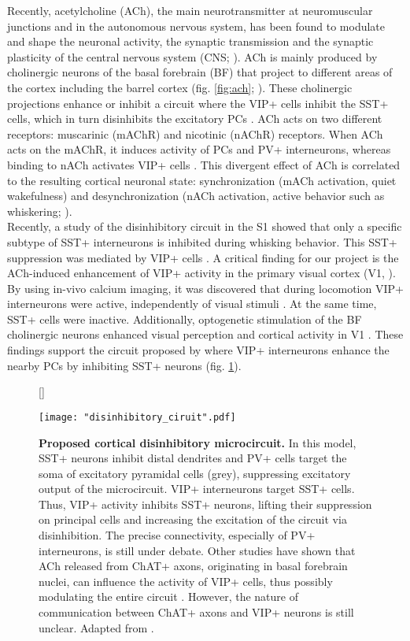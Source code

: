 Recently, acetylcholine (ACh), the main neurotransmitter at neuromuscular junctions and in the autonomous nervous system, has been found to modulate and shape the neuronal activity, the synaptic transmission and the synaptic plasticity of the central nervous system (CNS; \cite{Alitto2013,Fu2014,Picciotto2012a}). ACh is mainly produced by cholinergic neurons of the basal forebrain (BF) that project to different areas of the cortex including the barrel cortex (fig. \ref{fig:ach}; \cite{Thiele2013}). These cholinergic projections enhance or inhibit a circuit where the VIP+ cells inhibit the SST+ cells, which in turn disinhibits the excitatory PCs \citep{Pfeffer2013}. ACh acts on two different receptors: muscarinic (mAChR) and nicotinic (nAChR) receptors. When ACh acts on the mAChR, it induces activity of PCs and PV+ interneurons, whereas binding to nACh activates VIP+ cells \citep{Alitto2013}. This divergent effect of ACh is correlated to the resulting cortical neuronal state: synchronization (mACh activation, quiet wakefulness) and desynchronization (nACh activation, active behavior such as whiskering; \cite{Crochet2006,Eggermann2014}). \\ 
Recently, a study of the disinhibitory circuit in the S1 showed that only a specific subtype of SST+ interneurons is inhibited during whisking behavior. This SST+ suppression was mediated by VIP+ cells \citep{Munoz2017}. A critical finding for our project is the ACh-induced enhancement of VIP+ activity in the primary visual cortex (V1, \cite{Fu2014,Pinto2013}). By using in-vivo calcium imaging, it was discovered that during locomotion VIP+ interneurons were active, independently of visual stimuli \citep{Fu2014}. At the same time, SST+ cells were inactive. Additionally, optogenetic stimulation of the BF cholinergic neurons enhanced visual perception and cortical activity in V1 \citep{Pinto2013}. These findings support the circuit proposed by \cite{Pfeffer2013} where VIP+ interneurons enhance the nearby PCs by inhibiting SST+ neurons (fig. \ref{fig:disinhib_circuit}).\\

\begin{figure}
	[\FBwidth]
	{\caption{\textbf{Proposed cortical disinhibitory microcircuit.} In this model, SST+ neurons inhibit distal dendrites and PV+ cells target the soma of excitatory pyramidal cells (grey), suppressing excitatory output of the microcircuit. VIP+ interneurons target SST+ cells. Thus, VIP+ activity inhibits SST+ neurons, lifting their suppression on principal cells and increasing the excitation of the circuit via disinhibition. The precise connectivity, especially of PV+ interneurons, is still under debate. Other studies have shown that ACh released from ChAT+ axons, originating in basal forebrain nuclei, can influence the activity of VIP+ cells, thus possibly modulating the entire circuit \citep{Alitto2013}. However, the nature of communication between ChAT+ axons and VIP+ neurons is still unclear. Adapted from \cite{Wang2018}.}
	\label{fig:disinhib_circuit}}
	{\texttt{[image: "disinhibitory\_ciruit".pdf]}}	
\end{figure}

